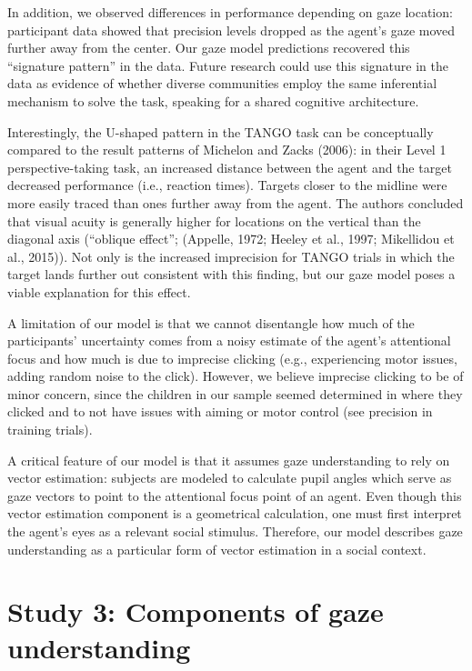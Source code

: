 \documentclass[
  man,mask,floatsintext]{apa7}
\begin{document}
In addition, we observed differences in performance depending on gaze location: participant data showed that precision levels dropped as the agent's gaze moved further away from the center. Our gaze model predictions recovered this ``signature pattern'' in the data. Future research could use this signature in the data as evidence of whether diverse communities employ the same inferential mechanism to solve the task, speaking for a shared cognitive architecture.

Interestingly, the U-shaped pattern in the TANGO task can be conceptually compared to the result patterns of Michelon and Zacks (2006): in their Level 1 perspective-taking task, an increased distance between the agent and the target decreased performance (i.e., reaction times). Targets closer to the midline were more easily traced than ones further away from the agent. The authors concluded that visual acuity is generally higher for locations on the vertical than the diagonal axis (``oblique effect''; (Appelle, 1972; Heeley et al., 1997; Mikellidou et al., 2015)). Not only is the increased imprecision for TANGO trials in which the target lands further out consistent with this finding, but our gaze model poses a viable explanation for this effect.

A limitation of our model is that we cannot disentangle how much of the participants' uncertainty comes from a noisy estimate of the agent's attentional focus and how much is due to imprecise clicking (e.g., experiencing motor issues, adding random noise to the click). However, we believe imprecise clicking to be of minor concern, since the children in our sample seemed determined in where they clicked and to not have issues with aiming or motor control (see precision in training trials).

A critical feature of our model is that it assumes gaze understanding to rely on vector estimation: subjects are modeled to calculate pupil angles which serve as gaze vectors to point to the attentional focus point of an agent. Even though this vector estimation component is a geometrical calculation, one must first interpret the agent's eyes as a relevant social stimulus. Therefore, our model describes gaze understanding as a particular form of vector estimation in a social context.

\hypertarget{study-3-components-of-gaze-understanding}{%
\section{Study 3: Components of gaze understanding}\label{study-3-components-of-gaze-understanding}}
\end{document}
